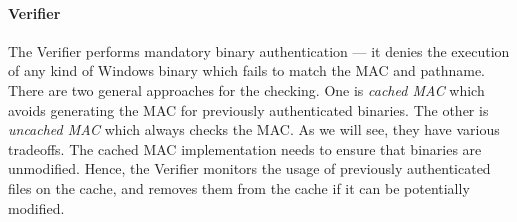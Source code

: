 \paragraph{Verifier}

The Verifier performs mandatory binary authentication ---
it denies the execution of any kind of Windows binary which
fails to match the MAC and pathname.
There are two general approaches for the checking.
One is {\em cached MAC} which avoids generating the MAC for
previously authenticated binaries.
The other is {\em uncached MAC} which always checks the MAC.
As we will see, they have various tradeoffs.
The cached MAC implementation needs to ensure that binaries are unmodified.
Hence, the Verifier monitors the usage of previously authenticated files 
on the cache, and removes them from the cache if it can be potentially modified.

